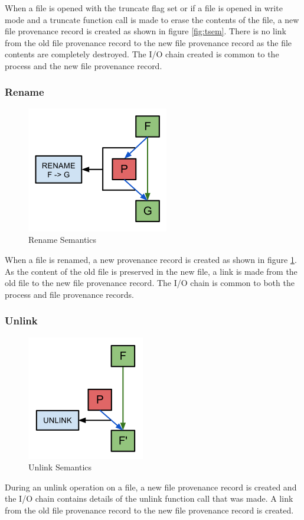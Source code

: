 When a file is opened with the truncate flag set or if a file is opened in write mode and a truncate function call is made to erase the contents of the file, a new file provenance record is created as shown in figure \ref{fig:tsem}. There is no link from the old file provenance record to the new file provenance record as the file contents are completely destroyed. The I/O chain created is common to the process and the new file provenance record.

\subsubsection{Rename}
\begin{figure}[H]
\centering
\includegraphics[scale=0.5]{res/sem/rename.png}
\caption{Rename Semantics}
\label{fig:rensem}
\end{figure}

When a file is renamed, a new provenance record is created as shown in figure \ref{fig:rensem}. As the content of the old file is preserved in the new file, a link is made from the old file to the new file provenance record. The I/O chain is common to both the process and file provenance records.

\subsubsection{Unlink}
\begin{figure}[H]
\centering
\includegraphics[scale=0.5]{res/sem/unlink.png}
\caption{Unlink Semantics}
\label{fig:usem}
\end{figure}

During an unlink operation on a file, a new file provenance record is created and the I/O chain contains details of the unlink function call that was made. A link from the old file provenance record to the new file provenance record is created.
